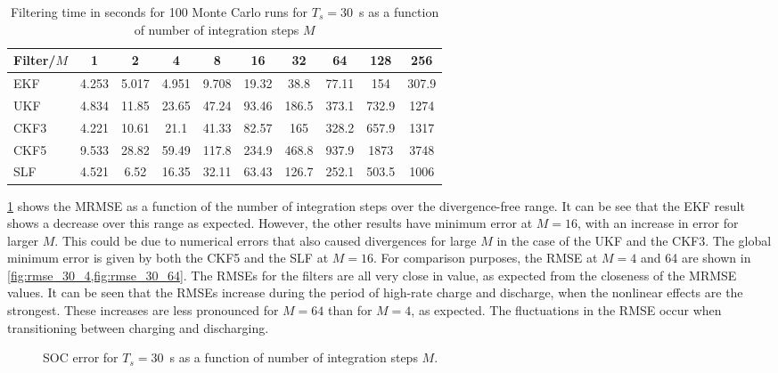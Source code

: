 \documentclass[../zhang_thesis.tex]{subfiles}
\begin{document}
\begin{table}[h]
\centering
\caption{Filtering time in seconds for 100 Monte Carlo runs for $T_s=30$~s as a function of number of integration steps $M$}
\begin{tabular}{@{}lccccccccc@{}}
\toprule
Filter/$M$ & 1     & 2     & 4     & 8     & 16    & 32    & 64    & 128   & 256   \\ \midrule
EKF        & 4.253 & 5.017 & 4.951 & 9.708 & 19.32 & 38.8  & 77.11 & 154   & 307.9 \\
UKF        & 4.834 & 11.85 & 23.65 & 47.24 & 93.46 & 186.5 & 373.1 & 732.9 & 1274  \\
CKF3       & 4.221 & 10.61 & 21.1  & 41.33 & 82.57 & 165   & 328.2 & 657.9 & 1317  \\
CKF5       & 9.533 & 28.82 & 59.49 & 117.8 & 234.9 & 468.8 & 937.9 & 1873  & 3748  \\
SLF        & 4.521 & 6.52  & 16.35 & 32.11 & 63.43 & 126.7 & 252.1 & 503.5 & 1006  \\ \bottomrule
\end{tabular}
\label{tab:time_30}
\end{table}

\cref{fig:mrmse_30} shows the MRMSE as a function of the number of integration steps over the divergence-free range. It can be see that the EKF result shows a decrease over this range as expected. However, the other results have minimum error at $M=16$, with an increase in error for larger $M$. This could be due to numerical errors that also caused divergences for large $M$ in the case of the UKF and the CKF3. The global minimum error is given by both the CKF5 and the SLF at $M=16$. For comparison purposes, the RMSE at $M=4$ and 64 are shown in \cref{fig:rmse_30_4,fig:rmse_30_64}. The RMSEs for the filters are all very close in value, as expected from the closeness of the MRMSE values. It can be seen that the RMSEs increase during the period of high-rate charge and discharge, when the nonlinear effects are the strongest. These increases are less pronounced for $M=64$ than for $M=4$, as expected. The fluctuations in the RMSE occur when transitioning between charging and discharging.

\begin{figure}[b]
\centering
%
\caption{SOC error for $T_s=30$~s as a function of number of integration steps $M$.}
\label{fig:mrmse_30}
\end{figure}
\end{document}
